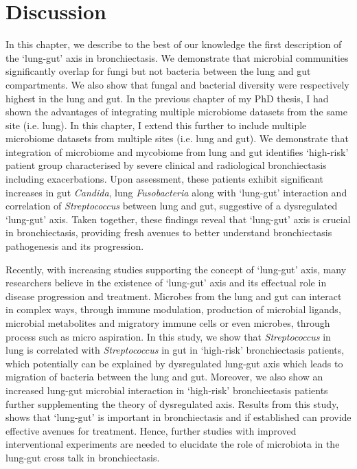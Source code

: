 \section{Discussion}

In this chapter, we describe to the best of our knowledge the first description of the `lung-gut' axis in bronchiectasis.
We demonstrate that microbial communities significantly overlap for fungi but not bacteria between the lung and gut compartments. We also show that fungal and bacterial diversity were respectively highest in the lung and gut. In the previous chapter of my PhD thesis, I had shown the advantages of integrating multiple microbiome datasets from the same site (i.e. lung). In this chapter, I extend this further to include multiple microbiome datasets from multiple sites (i.e. lung and gut). We demonstrate that integration of microbiome and mycobiome from lung and gut identifies `high-risk' patient group characterised by severe clinical and radiological bronchiectasis including exacerbations. Upon assessment, these patients exhibit significant increases in gut \textit{Candida}, lung \textit{Fusobacteria} along with `lung-gut' interaction  and correlation of \textit{Streptococcus} between lung and gut, suggestive of a dysregulated `lung-gut' axis. Taken together, these findings reveal that `lung-gut' axis is crucial in bronchiectasis, providing fresh avenues to better understand bronchiectasis pathogenesis and its progression. 

Recently, with increasing studies supporting the concept of `lung-gut' axis, many researchers believe in the existence of `lung-gut' axis and its effectual role in disease progression and treatment. Microbes from the lung and gut can interact in complex ways, through immune modulation, production of microbial ligands, microbial metabolites and migratory immune cells or even microbes, through process such as micro aspiration. In this study, we show that \textit{Streptococcus} in lung is correlated with \textit{Streptococcus} in gut in `high-risk' bronchiectasis patients, which potentially can be explained by dysregulated lung-gut axis which leads to migration of bacteria between the lung and gut. Moreover, we also show an increased lung-gut microbial interaction in `high-risk' bronchiectasis patients further supplementing the theory of dysregulated axis. Results from this study, shows that `lung-gut' is important in bronchiectasis and if established can provide effective avenues for treatment. Hence, further studies with improved interventional experiments are needed to elucidate the role of microbiota in the lung-gut cross talk in bronchiectasis.  

